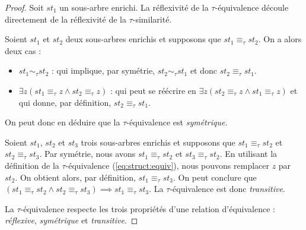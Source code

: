 \begin{proof}
    Soit $st_1$ un sous-arbre enrichi.
    La réflexivité de la $\tau$-équivalence découle directement de la réflexivité de la $\tau$-similarité.%

    Soient $st_1$ et $st_2$ deux sous-arbres enrichis et supposons que $st_1 \equiv_\tau st_2$.
    On a alors deux cas :
    \begin{itemize}
        \item $st_1 \sim_\tau st_2$ : qui implique, par symétrie, $st_2 \sim_\tau st_1$ et donc $st_2 \equiv_\tau st_1$.
        \item $\exists z (st_1 \equiv_\tau z \land st_2 \equiv_\tau z)$ : qui peut se réécrire en $\exists z (st_2 \equiv_\tau z \land st_1 \equiv_\tau z)$ et qui donne, par définition, $st_2 \equiv_\tau st_1$.
    \end{itemize}
    On peut donc en déduire que la $\tau$-équivalence est \emph{symétrique}.

    Soient $st_1$, $st_2$ et $st_3$ trois sous-arbres enrichis et supposons que $st_1 \equiv_\tau st_2$ et $st_2 \equiv_\tau st_3$.
    Par symétrie, nous avons $st_1 \equiv_\tau st_2$ et $st_3 \equiv_\tau st_2$.
    En utilisant la définition de la $\tau$-équivalence (\ref{eq:struct:equiv}), nous pouvons remplacer $z$ par $st_2$.
    On obtient alors, par définition, $st_1 \equiv_\tau st_3$.
    On peut conclure que $(st_1 \equiv_\tau st_2 \land st_2 \equiv_\tau st_3) \implies st_1 \equiv_\tau st_3$.
    La $\tau$-équivalence est donc \emph{transitive}.

    La $\tau$-équivalence respecte les trois propriétés d'une relation d'équivalence : \emph{réflexive}, \emph{symétrique} et \emph{transitive}.
\end{proof}

